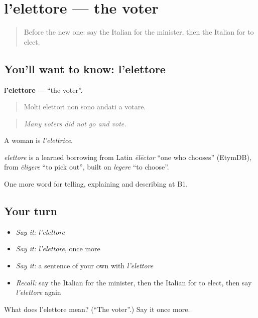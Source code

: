 \section[l'elettore]{l'elettore — the voter}

\label{lesson:IT-C369-elettore}



\begin{quote}
Before the new one: say the Italian for the minister, then the Italian for to elect.
\end{quote}

\subsection*{You'll want to know: l'elettore}
\textbf{l'elettore} — \textquotedblleft{}the voter\textquotedblright{}.

\begin{quote}
Molti elettori non sono andati a votare.
\end{quote}

\begin{quote}
\emph{Many voters did not go and vote.}
\end{quote}

A woman is \emph{l'elettrice}.

\begin{cousinweb}
\emph{elettore} is a learned borrowing from Latin \emph{ēlēctor} \textquotedblleft{}one who chooses\textquotedblright{} (EtymDB), from \emph{ēligere} \textquotedblleft{}to pick out\textquotedblright{}, built on \emph{legere} \textquotedblleft{}to choose\textquotedblright{}.
\end{cousinweb}

\begin{grammarlens}[title={What you've built}]
One more word for telling, explaining and describing at B1.
\end{grammarlens}

\subsection*{Your turn}
\begin{itemize}
\raggedright
  \item \emph{Say it:} \emph{l'elettore}
  \item \emph{Say it:} \emph{l'elettore}, once more
  \item \emph{Say it:} a sentence of your own with \emph{l'elettore}
  \item \emph{Recall:} say the Italian for the minister, then the Italian for to elect, then say \emph{l'elettore} again
\end{itemize}

\begin{tcolorbox}[breakable,colback=teal!4,colframe=teal!35!black,title={Before you move on}]
What does l'elettore mean? (\textquotedblleft{}The voter\textquotedblright{}.) Say it once more.
\end{tcolorbox}
